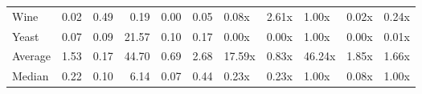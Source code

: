 \begin{tabular}{lrrrrrlllll}
Wine                &     0.02 & 0.49 &   0.19 & 0.00 &   0.05 &    0.08x &  2.61x &    1.00x &   0.02x &  0.24x \\
Yeast               &     0.07 & 0.09 &  21.57 & 0.10 &   0.17 &    0.00x &  0.00x &    1.00x &   0.00x &  0.01x \\
Average             &     1.53 & 0.17 &  44.70 & 0.69 &   2.68 &   17.59x &  0.83x &   46.24x &   1.85x &  1.66x \\
Median              &     0.22 & 0.10 &   6.14 & 0.07 &   0.44 &    0.23x &  0.23x &    1.00x &   0.08x &  1.00x \\
\bottomrule
\end{tabular}
